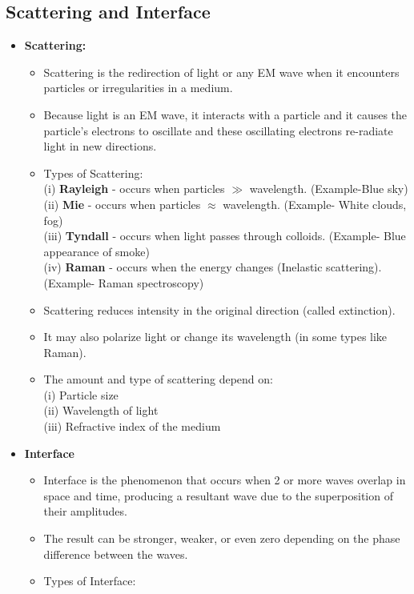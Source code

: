 \documentclass[12pt]{article}
\begin{document}
\subsection{Scattering and Interface}
\begin{itemize}
\item{\textbf{Scattering:}}
\begin{itemize}[label=\textrightarrow]
\item Scattering is the redirection of light or any EM wave when it encounters particles or irregularities in a medium.
\item Because light is an EM wave, it interacts with a particle and it causes the particle's electrons to oscillate and these oscillating electrons re-radiate light in new directions.
\item Types of Scattering:\\
(i) \textbf{Rayleigh} - occurs when particles $\gg$ wavelength. (Example-Blue sky)\\
(ii) \textbf{Mie} - occurs when particles $\approx$ wavelength. (Example- White clouds, fog)\\
(iii) \textbf{Tyndall} - occurs when light passes through colloids. (Example- Blue appearance of smoke)\\
(iv) \textbf{Raman} - occurs when the energy changes (Inelastic scattering). (Example- Raman spectroscopy)
\item Scattering reduces intensity in the original direction (called extinction).
\item It may also polarize light or change its wavelength (in some types like Raman).
\item The amount and type of scattering depend on:\\
(i) Particle size\\
(ii) Wavelength of light\\
(iii) Refractive index of the medium
\end{itemize}
\item{\textbf{Interface}}
\begin{itemize}[label=\textrightarrow]
\item Interface is the phenomenon that occurs when 2 or more waves overlap in space and time, producing a resultant wave due to the superposition of their amplitudes.
\item The result can be stronger, weaker, or even zero depending on the phase difference between the waves.
\item Types of Interface:\\

\end{itemize}
\end{itemize}
\end{document}

